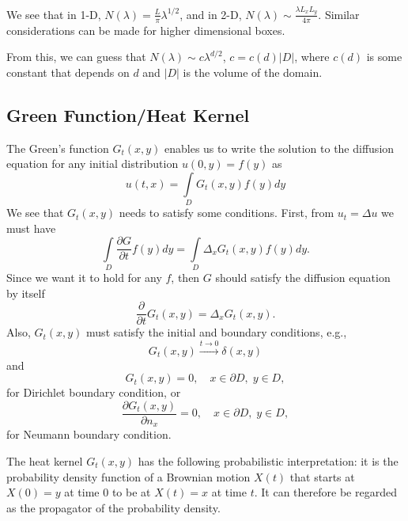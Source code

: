 We see that in 1-D, $N(\lambda) = \frac{L}{\pi}\lambda^{1/2}$, and in 2-D, $N(\lambda) \sim \frac{\lambda L_x L_y}{4\pi}$. Similar considerations can be made for higher dimensional boxes.

From this, we can guess that $N(\lambda) \sim c \lambda^{d/2}$, $c = c(d) |D|$, where $c(d)$ is some constant that depends on $d$ and $|D|$ is the volume of the domain.

\subsection{Green Function/Heat Kernel}
The Green's function $G_t(x,y)$ enables us to write the solution to the diffusion equation for any initial distribution $u(0,y)=f(y)$ as
\begin{equation*}
u(t,x)=\int\limits_D G_t(x,y)f(y)dy
\end{equation*}
We see that $G_t(x,y)$ needs to satisfy some conditions. First, from $u_t = \Delta u$ we must have
\begin{equation*}
\int\limits_D \frac{\partial G}{\partial t} f(y) dy = \int\limits_D \Delta_x G_t(x,y)f(y)dy.
\end{equation*}
Since we want it to hold for any $f$, then $G$ should satisfy the diffusion equation by itself
\begin{equation*}
\frac{\partial}{\partial t}G_t(x,y)=\Delta_x G_t(x,y).
\end{equation*}
Also, $G_t(x,y)$ must satisfy the initial and boundary conditions, e.g., $$G_t(x,y) \xrightarrow{t\rightarrow 0}\delta(x,y)$$ and
$$G_t(x,y) = 0, \quad x\in \partial D,\; y\in D,$$
for Dirichlet boundary condition, or
$$\frac{\partial G_t(x,y)}{\partial n_x} = 0, \quad x\in \partial D,\; y\in D,$$
for Neumann boundary condition.

The heat kernel $G_t(x,y)$ has the following probabilistic interpretation: it is the probability density function of a Brownian motion $X(t)$ that starts at $X(0)=y$ at time 0 to be at $X(t)=x$ at time $t$. It can therefore be regarded as the propagator of the probability density. 

